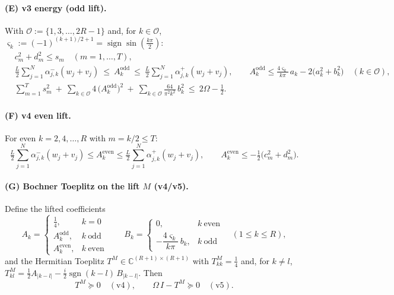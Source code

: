 \documentclass[11pt]{article}
\newcommand{\C}{\mathbb{C}}
\newcommand{\sgn}{\operatorname{sgn}}
\newcommand{\psdge}{\succeq 0}
\begin{document}
\paragraph{(E) v3 energy (odd lift).} With
$\mathcal O:=\{1,3,\dots,2R-1\}$ and, for $k\in\mathcal O$,
$\varsigma_k:=(-1)^{(k+1)/2+1}=\operatorname{sign}\sin(\tfrac{k\pi}{2})$:
\begin{align}
&c_m^2+d_m^2\le s_m\quad(m=1,\dots,T), \tag{E11}\\
&\tfrac{L}{2}\sum_{j=1}^N\alpha^{-}_{j,k}(w_j+v_j)\ \le\ A^{\mathrm{odd}}_k
   \ \le\ \tfrac{L}{2}\sum_{j=1}^N\alpha^{+}_{j,k}(w_j+v_j),
   \qquad
   A^{\mathrm{odd}}_k\le \frac{4\varsigma_k}{k\pi}\,a_k-2\bigl(a_k^2+b_k^2\bigr)
   \quad(k\in\mathcal O), \tag{E12}\\
&\sum_{m=1}^{T} s_m^2
  \ +\ \sum_{k\in\mathcal O} 4\,\bigl(A^{\mathrm{odd}}_k\bigr)^2
  \ +\ \sum_{k\in\mathcal O}\frac{64}{\pi^2 k^2}\,b_k^2
  \ \le\ 2\Omega-\tfrac12. \tag{E13}
\end{align}

\paragraph{(F) v4 even lift.} For even $k=2,4,\dots,R$ with $m=k/2\le T$:
\begin{equation}
\tfrac{L}{2}\sum_{j=1}^N\alpha^{-}_{j,k}(w_j+v_j)\le A^{\mathrm{even}}_k
 \le \tfrac{L}{2}\sum_{j=1}^N\alpha^{+}_{j,k}(w_j+v_j),\qquad
 A^{\mathrm{even}}_k\le-\tfrac12\bigl(c_m^2+d_m^2\bigr). \tag{E14}
\end{equation}

\paragraph{(G) Bochner Toeplitz on the lift $M$ (v4/v5).}
Define the lifted coefficients
\[
 A_k=\begin{cases}\tfrac14,&k=0\\ A^{\mathrm{odd}}_k,&k\ \text{odd}\\ A^{\mathrm{even}}_k,&k\ \text{even}\end{cases}
 \qquad
 B_k=\begin{cases}0,&k\ \text{even}\\[2pt] -\dfrac{4\varsigma_k}{k\pi}\,b_k,&k\ \text{odd}\end{cases}
 \quad(1\le k\le R),
\]
and the Hermitian Toeplitz $T^{M}\in\C^{(R+1)\times(R+1)}$ with
$T^{M}_{kk}=\tfrac14$ and, for $k\ne l$,
$T^{M}_{kl}=\tfrac12 A_{|k-l|}-\tfrac{i}{2}\sgn(k-l)\,B_{|k-l|}$. Then
\begin{equation}
 T^{M}\psdge \quad(\text{v4}),\qquad \Omega\,I-T^{M}\psdge \quad(\text{v5}). \tag{E15}
\end{equation}
\end{document}
